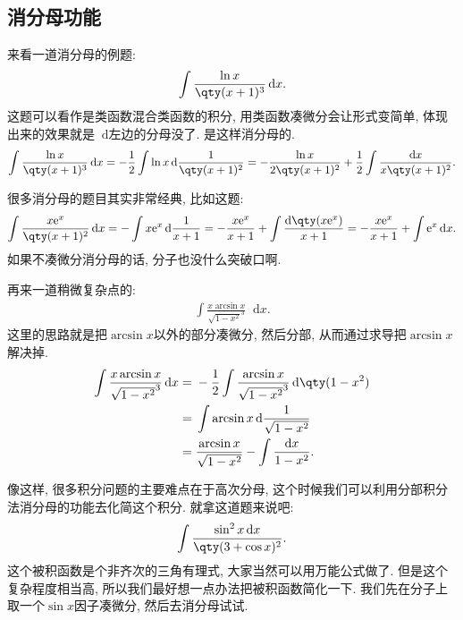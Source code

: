 \documentclass{ctexbook}
\newcommand{\e}{\mathrm{e}}
\newcommand*{\dif}{\mathop{}\!\mathrm{d}}
\begin{document}
{\subsection{消分母功能}
来看一道消分母的例题: 
\begin{align*}
\int\frac{\ln{x}}{\qty(x+1)^{3}}\dif{x}
.\end{align*}
这题可以看作是\uppercase\expandafter{}类函数混合\uppercase\expandafter{}类函数的积分, 用\uppercase\expandafter{}类函数凑微分会让形式变简单, 体现出来的效果就是$\dif$左边的分母没了. 是这样消分母的. 
\begin{align*}
\int\frac{\ln{x}}{\qty(x+1)^{3}}\dif{x}=-\frac{1}{2}\int\ln{x}\dif{\frac{1}{\qty(x+1)^{2}}}=-\frac{\ln{x}}{2\qty(x+1)^{2}}+\frac{1}{2}\int\frac{\dif{x}}{x\qty(x+1)^{2}}
.\end{align*}\par
很多消分母的题目其实非常经典, 比如这题: 
\begin{align*}
\int\frac{x\e^{x}}{\qty(x+1)^{2}}\dif{x}=-\int x\e^{x}\dif{\frac{1}{x+1}}=-\frac{x\e^{x}}{x+1}+\int\frac{\dif{\qty(x\e^{x})}}{x+1}=-\frac{x\e^{x}}{x+1}+\int\e^{x}\dif{x}
.\end{align*}
如果不凑微分消分母的话, 分子也没什么突破口啊. \par
再来一道稍微复杂点的: 
\begin{align*}
\int\frac{x\arcsin{x}}{\sqrt{1-x^{2}}^{3}}\dif{x}
.\end{align*}
这里的思路就是把$\arcsin{x}$以外的部分凑微分, 然后分部, 从而通过求导把$\arcsin{x}$解决掉. 
\begin{align*}
\int\frac{x\arcsin{x}}{\sqrt{1-x^{2}}^{3}}\dif{x}={}&-\frac{1}{2}\int\frac{\arcsin{x}}{\sqrt{1-x^{2}}^{3}}\dif{\qty(1-x^{2})}\\
={}&\int\arcsin{x}\dif{\frac{1}{\sqrt{1-x^{2}}}}\\
={}&\frac{\arcsin{x}}{\sqrt{1-x^{2}}}-\int\frac{\dif{x}}{1-x^{2}}
.\end{align*}\par
像这样, 很多积分问题的主要难点在于高次分母, 这个时候我们可以利用分部积分法消分母的功能去化简这个积分. 就拿这道题来说吧: 
\begin{align*}
\int\frac{\sin^{2}{x}\dif{x}}{\qty(3+\cos{x})^{2}}
.\end{align*}
这个被积函数是个非齐次的三角有理式, 大家当然可以用万能公式做了. 但是这个复杂程度相当高, 所以我们最好想一点办法把被积函数简化一下. 我们先在分子上取一个$\sin{x}$因子凑微分, 然后去消分母试试. 
\begin{align*}

\end{align*}}
\end{document}
